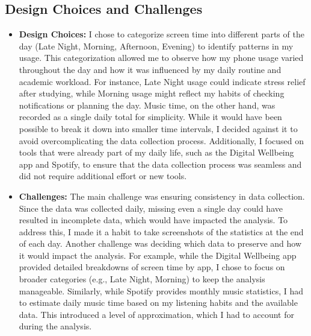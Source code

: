 \documentclass[24pt]{article}
\begin{document}
\subsection*{Design Choices and Challenges}
\begin{itemize}
    \item \textbf{Design Choices:} I chose to categorize screen time into different parts of the day (Late Night, Morning, Afternoon, Evening) to identify patterns in my usage. This categorization allowed me to observe how my phone usage varied throughout the day and how it was influenced by my daily routine and academic workload. For instance, Late Night usage could indicate stress relief after studying, while Morning usage might reflect my habits of checking notifications or planning the day. Music time, on the other hand, was recorded as a single daily total for simplicity. While it would have been possible to break it down into smaller time intervals, I decided against it to avoid overcomplicating the data collection process. Additionally, I focused on tools that were already part of my daily life, such as the Digital Wellbeing app and Spotify, to ensure that the data collection process was seamless and did not require additional effort or new tools.
    \item \textbf{Challenges:} The main challenge was ensuring consistency in data collection. Since the data was collected daily, missing even a single day could have resulted in incomplete data, which would have impacted the analysis. To address this, I made it a habit to take screenshots of the statistics at the end of each day. Another challenge was deciding which data to preserve and how it would impact the analysis. For example, while the Digital Wellbeing app provided detailed breakdowns of screen time by app, I chose to focus on broader categories (e.g., Late Night, Morning) to keep the analysis manageable. Similarly, while Spotify provides monthly music statistics, I had to estimate daily music time based on my listening habits and the available data. This introduced a level of approximation, which I had to account for during the analysis.
\end{itemize}
\end{document}
